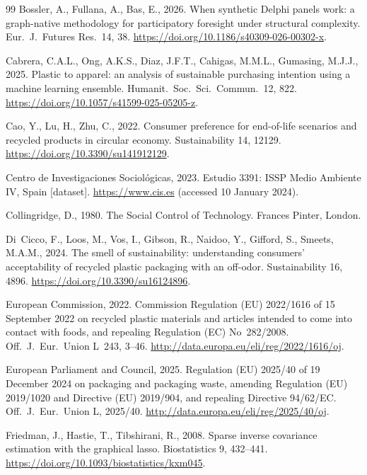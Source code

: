 \begin{thebibliography}{99}
Bossler, A., Fullana, A., Bas, E., 2026. When synthetic Delphi panels work: a graph-native
methodology for participatory foresight under structural complexity. Eur.\ J.\ Futures Res.\
14, 38. \url{https://doi.org/10.1186/s40309-026-00302-x}.

Cabrera, C.A.L., Ong, A.K.S., Diaz, J.F.T., Cahigas, M.M.L., Gumasing, M.J.J., 2025. Plastic to
apparel: an analysis of sustainable purchasing intention using a machine learning ensemble.
Humanit.\ Soc.\ Sci.\ Commun.\ 12, 822. \url{https://doi.org/10.1057/s41599-025-05205-z}.

Cao, Y., Lu, H., Zhu, C., 2022. Consumer preference for end-of-life scenarios and recycled
products in circular economy. Sustainability 14, 12129.
\url{https://doi.org/10.3390/su141912129}.

Centro de Investigaciones Sociol\'ogicas, 2023. Estudio 3391: ISSP Medio Ambiente IV, Spain
[dataset]. \url{https://www.cis.es} (accessed 10 January 2024).

Collingridge, D., 1980. The Social Control of Technology. Frances Pinter, London.

Di~Cicco, F., Loos, M., Vos, I., Gibson, R., Naidoo, Y., Gifford, S., Smeets, M.A.M., 2024. The
smell of sustainability: understanding consumers' acceptability of recycled plastic packaging
with an off-odor. Sustainability 16, 4896. \url{https://doi.org/10.3390/su16124896}.

European Commission, 2022. Commission Regulation (EU) 2022/1616 of 15 September 2022 on
recycled plastic materials and articles intended to come into contact with foods, and
repealing Regulation (EC) No~282/2008. Off.\ J.\ Eur.\ Union L~243, 3--46.
\url{http://data.europa.eu/eli/reg/2022/1616/oj}.

European Parliament and Council, 2025. Regulation (EU) 2025/40 of 19 December 2024 on
packaging and packaging waste, amending Regulation (EU) 2019/1020 and Directive (EU)
2019/904, and repealing Directive 94/62/EC. Off.\ J.\ Eur.\ Union L, 2025/40.
\url{http://data.europa.eu/eli/reg/2025/40/oj}.

Friedman, J., Hastie, T., Tibshirani, R., 2008. Sparse inverse covariance estimation with the
graphical lasso. Biostatistics 9, 432--441. \url{https://doi.org/10.1093/biostatistics/kxm045}.


\end{thebibliography}
